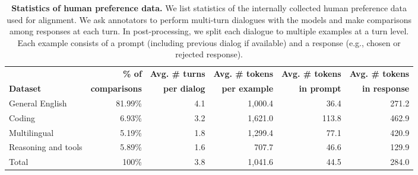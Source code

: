 \begin{table}[t]
  \centering
  \setlength{\tabcolsep}{4pt}
   {
  \begin{tabular}{@{}l@{\hspace*{0mm}}rrrrr@{}}
    \toprule
      & \textbf{\% of} & \textbf{Avg. \# turns} & \textbf{Avg. \# tokens} & \textbf{Avg. \# tokens} & \textbf{Avg. \# tokens} \\
     \textbf{Dataset} & \textbf{comparisons} &\textbf{per dialog} & \textbf{per example} &\textbf{in prompt} & \textbf{in response} \\
    \midrule
    General English & 81.99\% & 4.1 & 1,000.4 & 36.4 & 271.2 \\
    Coding & 6.93\% & 3.2 & 1,621.0 & 113.8 & 462.9 \\
    Multilingual & 5.19\% & 1.8 & 1,299.4 & 77.1 & 420.9 \\ 
    Reasoning and tools & 5.89\% & 1.6 & 707.7 & 46.6 & 129.9 \\
    \midrule
    Total & 100\% & 3.8 & 1,041.6 & 44.5 & 284.0 \\
    \bottomrule
  \end{tabular}}
  \vspace{0.3cm}
  \caption{\textbf{Statistics of human preference data.} We list statistics of the internally collected human preference data used for \llamathree alignment. We ask annotators to perform multi-turn dialogues with the models and make comparisons among responses at each turn. In post-processing, we split each dialogue to multiple examples at a turn level. Each example consists of a prompt (including previous dialog if available) and a response (e.g., chosen or rejected response).}
  \label{tab:pref_data}
\end{table}
